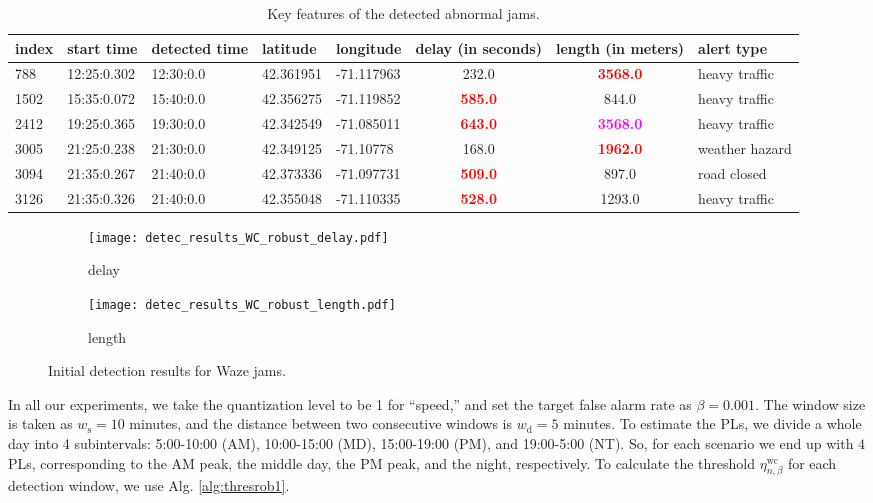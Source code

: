 \documentclass[10pt, twocolumn]{IEEEtran}
\begin{document}
\begin{table*}[hbt]
	\centering
	\caption{Key features of the detected abnormal jams.} \label{tab1}
	\resizebox{0.9\linewidth}{!}
	{\begin{tabular}{lllllccl}
			\toprule[1.2pt]
			\textbf{index}  & \textbf{start time} & \textbf{detected time} & \textbf{latitude}  & \textbf{longitude} & \textbf{delay (in seconds)} & \textbf{length (in meters)} & \textbf{alert type}   \\
			\midrule[1.2pt]
			788  & 12:25:0.302  & 12:30:0.0 & 42.361951 & -71.117963  & 232.0  & \textcolor{red}{\textbf{3568.0}} & heavy traffic\\
			1502  & 15:35:0.072  & 15:40:0.0 & 42.356275 & -71.119852  & \textcolor{red}{\textbf{585.0}}  & 844.0 & heavy traffic\\
			2412  & 19:25:0.365  & 19:30:0.0 & 42.342549 & -71.085011 & \textcolor{red}{\textbf{643.0}} & \textcolor{magenta}{\textbf{3568.0}} & heavy traffic\\
			3005  & 21:25:0.238  & 21:30:0.0 & 42.349125 &  -71.10778   & 168.0  & \textcolor{red}{\textbf{1962.0}} &  weather hazard\\
			3094  & 21:35:0.267  & 21:40:0.0 & 42.373336 & -71.097731  & \textcolor{red}{\textbf{509.0}}  & 897.0 & road closed \\
			3126  & 21:35:0.326  & 21:40:0.0 &  42.355048 & -71.110335   & \textcolor{red}{\textbf{528.0}}  & 1293.0 & heavy traffic\\
			\bottomrule[1.2pt]
		\end{tabular}}
	\end{table*}

	
\begin{figure}[htp]  
	\centering
	\begin{subfigure}[b]{0.485\textwidth}
		\texttt{[image: detec\_results\_WC\_robust\_delay.pdf]}
		\caption{delay}
		\label{wazeDelay}
	\end{subfigure} 
	\begin{subfigure}[b]{0.485\textwidth}
		\texttt{[image: detec\_results\_WC\_robust\_length.pdf]}
		\caption{length}
		\label{wazeLength}
	\end{subfigure}   
	\caption{Initial detection results for Waze jams.}
	\label{fig:anoWaze}
\end{figure}


In all our experiments, we take the quantization level to be 1 for
``speed,'' and set the target false alarm rate as $\beta = 0.001$. The
window size is taken as $w_{\text{s}} = 10$ minutes, and the distance
between two consecutive windows is $w_{\text{d}} = 5$ minutes.  To
estimate the PLs, we divide a whole day into 4 subintervals: 5:00-10:00
(AM), 10:00-15:00 (MD), 15:00-19:00 (PM), and 19:00-5:00 (NT).  So, for
each scenario we end up with $4$ PLs, corresponding to the AM peak, the
middle day, the PM peak, and the night, respectively. To calculate the
threshold $\eta_{n,\beta}^{\text{wc}}$ for each detection window, we use
Alg. \ref{alg:thresrob1}.
\end{document}
